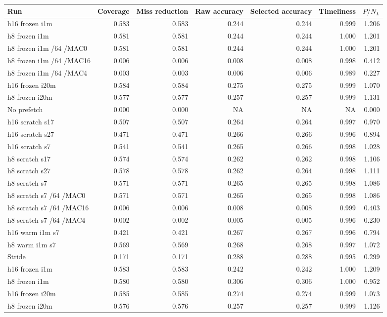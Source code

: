 \documentclass[10pt]{article}
\begin{document}
\begin{center}
\scriptsize
\begin{longtable}{lrrrrrr}
\toprule
Run & Coverage & Miss reduction & Raw accuracy & Selected accuracy & Timeliness & $P/N_L$ \\
\midrule
\endhead
h16 frozen i1m & 0.583 & 0.583 & 0.244 & 0.244 & 0.999 & 1.206 \\
h8 frozen i1m & 0.581 & 0.581 & 0.244 & 0.244 & 1.000 & 1.201 \\
h8 frozen i1m /64 /MAC0 & 0.581 & 0.581 & 0.244 & 0.244 & 1.000 & 1.201 \\
h8 frozen i1m /64 /MAC16 & 0.006 & 0.006 & 0.008 & 0.008 & 0.998 & 0.412 \\
h8 frozen i1m /64 /MAC4 & 0.003 & 0.003 & 0.006 & 0.006 & 0.989 & 0.227 \\
h16 frozen i20m & 0.584 & 0.584 & 0.275 & 0.275 & 0.999 & 1.070 \\
h8 frozen i20m & 0.577 & 0.577 & 0.257 & 0.257 & 0.999 & 1.131 \\
No prefetch & 0.000 & 0.000 & NA & NA & NA & 0.000 \\
h16 scratch s17 & 0.507 & 0.507 & 0.264 & 0.264 & 0.997 & 0.970 \\
h16 scratch s27 & 0.471 & 0.471 & 0.266 & 0.266 & 0.996 & 0.894 \\
h16 scratch s7 & 0.541 & 0.541 & 0.265 & 0.266 & 0.998 & 1.028 \\
h8 scratch s17 & 0.574 & 0.574 & 0.262 & 0.262 & 0.998 & 1.106 \\
h8 scratch s27 & 0.578 & 0.578 & 0.262 & 0.264 & 0.998 & 1.111 \\
h8 scratch s7 & 0.571 & 0.571 & 0.265 & 0.265 & 0.998 & 1.086 \\
h8 scratch s7 /64 /MAC0 & 0.571 & 0.571 & 0.265 & 0.265 & 0.998 & 1.086 \\
h8 scratch s7 /64 /MAC16 & 0.006 & 0.006 & 0.008 & 0.008 & 0.999 & 0.403 \\
h8 scratch s7 /64 /MAC4 & 0.002 & 0.002 & 0.005 & 0.005 & 0.996 & 0.230 \\
h16 warm i1m s7 & 0.421 & 0.421 & 0.267 & 0.267 & 0.996 & 0.794 \\
h8 warm i1m s7 & 0.569 & 0.569 & 0.268 & 0.268 & 0.997 & 1.072 \\
Stride & 0.171 & 0.171 & 0.288 & 0.288 & 0.995 & 0.299 \\
h16 frozen i1m & 0.583 & 0.583 & 0.242 & 0.242 & 1.000 & 1.209 \\
h8 frozen i1m & 0.580 & 0.580 & 0.306 & 0.306 & 1.000 & 0.952 \\
h16 frozen i20m & 0.585 & 0.585 & 0.274 & 0.274 & 0.999 & 1.073 \\
h8 frozen i20m & 0.576 & 0.576 & 0.257 & 0.257 & 0.999 & 1.126 \\
\bottomrule
\end{longtable}
\end{center}
\end{document}
